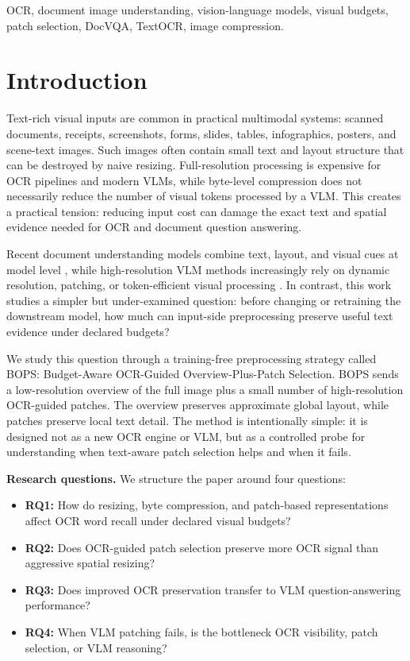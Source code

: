 \documentclass[conference]{IEEEtran}
\newcommand{\method}{BOPS}
\begin{document}
\begin{IEEEkeywords}
OCR, document image understanding, vision-language models, visual budgets, patch selection, DocVQA, TextOCR, image compression.
\end{IEEEkeywords}

\section{Introduction}
Text-rich visual inputs are common in practical multimodal systems: scanned documents, receipts, screenshots, forms, slides, tables, infographics, posters, and scene-text images. Such images often contain small text and layout structure that can be destroyed by naive resizing. Full-resolution processing is expensive for OCR pipelines and modern VLMs, while byte-level compression does not necessarily reduce the number of visual tokens processed by a VLM. This creates a practical tension: reducing input cost can damage the exact text and spatial evidence needed for OCR and document question answering.

Recent document understanding models combine text, layout, and visual cues at model level \cite{layoutlm,layoutlmv2,layoutlmv3,docformer,tilt,udop,donut,pix2struct}, while high-resolution VLM methods increasingly rely on dynamic resolution, patching, or token-efficient visual processing \cite{navit,llavauhd,qwen25vl}. In contrast, this work studies a simpler but under-examined question: before changing or retraining the downstream model, how much can input-side preprocessing preserve useful text evidence under declared budgets?

We study this question through a training-free preprocessing strategy called \method{}: Budget-Aware OCR-Guided Overview-Plus-Patch Selection. \method{} sends a low-resolution overview of the full image plus a small number of high-resolution OCR-guided patches. The overview preserves approximate global layout, while patches preserve local text detail. The method is intentionally simple: it is designed not as a new OCR engine or VLM, but as a controlled probe for understanding when text-aware patch selection helps and when it fails.

\textbf{Research questions.} We structure the paper around four questions:
\begin{itemize}[leftmargin=*]
    \item \textbf{RQ1:} How do resizing, byte compression, and patch-based representations affect OCR word recall under declared visual budgets?
    \item \textbf{RQ2:} Does OCR-guided patch selection preserve more OCR signal than aggressive spatial resizing?
    \item \textbf{RQ3:} Does improved OCR preservation transfer to VLM question-answering performance?
    \item \textbf{RQ4:} When VLM patching fails, is the bottleneck OCR visibility, patch selection, or VLM reasoning?
\end{itemize}
\end{document}
